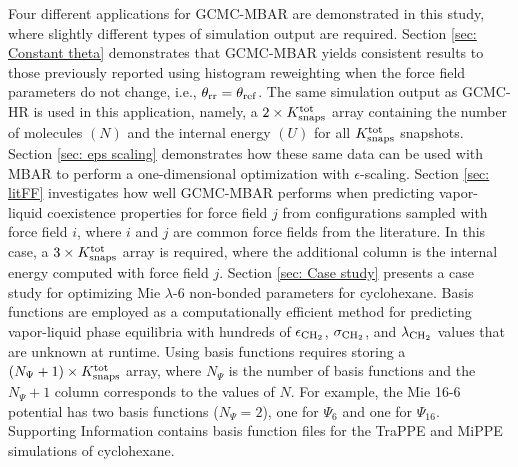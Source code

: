 \documentclass[journal=jced,manuscript=article]{achemso}
\begin{document}
Four different applications for GCMC-MBAR are demonstrated in this study, where slightly different types of simulation output are required. Section \ref{sec: Constant theta} demonstrates that GCMC-MBAR yields consistent results to those previously reported using histogram reweighting when the force field parameters do not change, i.e., $\theta_{\rm rr} = \theta_{\rm ref}$. The same simulation output as GCMC-HR is used in this application, namely, a $2 \times K^{\rm tot}_{\rm snaps}$ array containing the number of molecules $(N)$ and the internal energy $(U)$ for all $K^{\rm tot}_{\rm snaps}$ snapshots. Section \ref{sec: eps scaling} demonstrates how these same data can be used with MBAR to perform a one-dimensional optimization with $\epsilon$-scaling. Section \ref{sec: litFF} investigates how well GCMC-MBAR performs when predicting vapor-liquid coexistence properties for force field $j$ from configurations sampled with force field $i$, where $i$ and $j$ are common force fields from the literature. In this case, a $3 \times K^{\rm tot}_{\rm snaps}$ array is required, where the additional column is the internal energy computed with force field $j$. Section \ref{sec: Case study} presents a case study for optimizing Mie $\lambda$-6 non-bonded parameters for cyclohexane. Basis functions are employed as a computationally efficient method for predicting vapor-liquid phase equilibria with hundreds of $\epsilon_{\rm CH_2}$, $\sigma_{\rm CH_2}$, and $\lambda_{\rm CH_2}$ values that are unknown at runtime. Using basis functions requires storing a $(N_{\Psi} + 1) \times K^{\rm tot}_{\rm snaps}$ array, where $N_{\Psi}$ is the number of basis functions and the $N_{\Psi} + 1$ column corresponds to the values of $N$. For example, the Mie 16-6 potential has two basis functions ($N_{\Psi} = 2$), one for $\Psi_{6}$ and one for $\Psi_{16}$. Supporting Information contains basis function files for the TraPPE and MiPPE simulations of cyclohexane.

\end{document}
